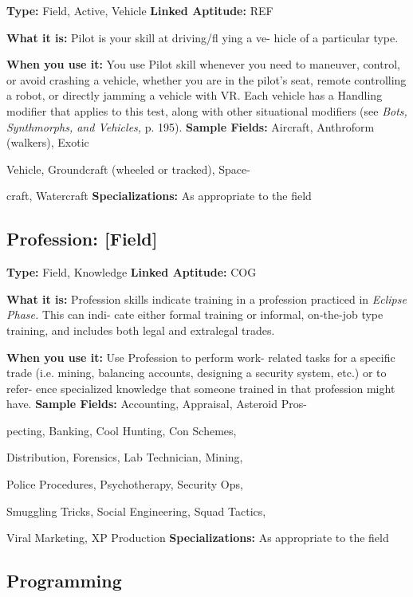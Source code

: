 \textbf{Type: }Field, Active, Vehicle
\textbf{Linked Aptitude:} REF

\textbf{What it is:} Pilot is your skill at driving/fl ying a ve-
hicle of a particular type.

\textbf{When you use it:} You use Pilot skill whenever you 
need to maneuver, control, or avoid crashing a vehicle, 
whether you are in the pilot's seat, remote controlling 
a robot, or directly jamming a vehicle with VR. Each 
vehicle has a Handling modifier that applies to this 
test, along with other situational modifiers (see \textit{Bots, }
\textit{Synthmorphs, and Vehicles,} p. 195).
\textbf{Sample Fields:} Aircraft, Anthroform (walkers), Exotic 

Vehicle, Groundcraft (wheeled or tracked), Space-

craft, Watercraft
\textbf{Specializations:} As appropriate to the field

\subsection{Profession: [Field]}

\textbf{Type:} Field, Knowledge
\textbf{Linked Aptitude:} COG

\textbf{What it is:} Profession skills indicate training in a 
profession practiced in \textit{Eclipse Phase.} This can indi-
cate either formal training or informal, on-the-job type 
training, and includes both legal and extralegal trades.

\textbf{When you use it:} Use Profession to perform work-
related tasks for a specific trade (i.e. mining, balancing 
accounts, designing a security system, etc.) or to refer-
ence specialized knowledge that someone trained in 
that profession might have.
\textbf{Sample Fields:} Accounting, Appraisal, Asteroid Pros-

pecting, Banking, Cool Hunting, Con Schemes, 

Distribution, Forensics, Lab Technician, Mining, 

Police Procedures, Psychotherapy, Security Ops, 

Smuggling Tricks, Social Engineering, Squad Tactics, 

Viral Marketing, XP Production
\textbf{Specializations:} As appropriate to the field

\subsection{Programming}

